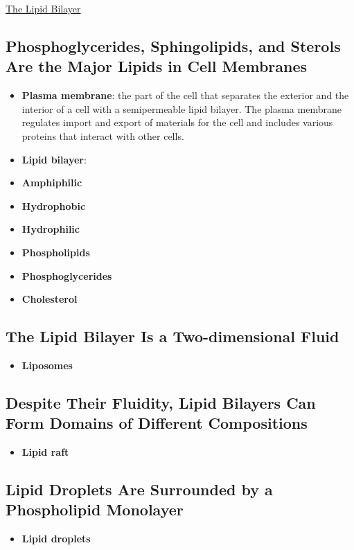 \documentclass[12pt,letterpaper]{article}
\begin{document}
\hypertarget{10.1}{}
\begin{secbox}{\hyperlink{10}{The Lipid Bilayer}}{
    \subsection*{Phosphoglycerides, Sphingolipids, and Sterols Are the Major
    Lipids in Cell Membranes}
    \begin{itemize}
        \item \textbf{Plasma membrane}: the part of the cell that separates the exterior and the interior of a cell with a semipermeable lipid bilayer. The plasma membrane regulates import and export of materials for the cell and includes various proteins that interact with other cells. 
        \item \textbf{Lipid bilayer}: 
        \item \textbf{Amphiphilic}
        \item \textbf{Hydrophobic}
        \item \textbf{Hydrophilic}
        \item \textbf{Phospholipids}
        \item \textbf{Phosphoglycerides}
        \item \textbf{Cholesterol}
    \end{itemize}

    \subsection*{The Lipid Bilayer Is a Two-dimensional Fluid}
    \begin{itemize}   
        \item \textbf{Liposomes}
    \end{itemize} 

    \subsection*{Despite Their Fluidity, Lipid Bilayers Can Form Domains of Different Compositions}
    \begin{itemize}
        \item \textbf{Lipid raft}
    \end{itemize}

    \subsection*{Lipid Droplets Are Surrounded by a Phospholipid Monolayer}
    \begin{itemize}
        \item \textbf{Lipid droplets}
    \end{itemize}

}
\end{secbox}
\end{document}
